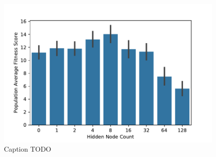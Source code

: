 \begin{figure}[!htbp]
\begin{center}
\includegraphics[width=\textwidth]{img/hidden_node_count_average_fitness.pdf}
\caption{
Caption TODO
}
\label{fig:hidden_node_count_average_fitness}
\end{center}
\end{figure}
